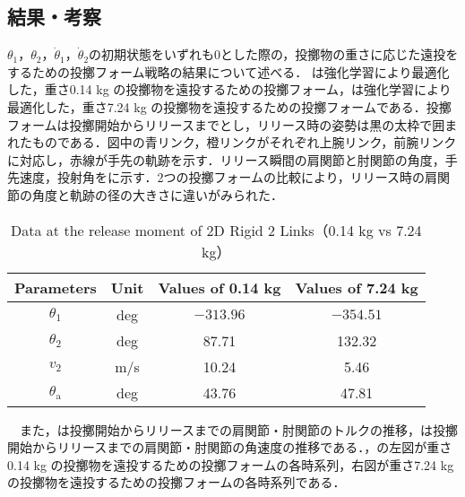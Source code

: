 \subsection{結果・考察}
$\theta_{1}$，$\theta_{2}$，$\dot{\theta}_{1}$，$\dot{\theta}_{2}$の初期状態をいずれも0とした際の，投擲物の重さに応じた遠投をするための投擲フォーム戦略の結果について述べる．
は強化学習により最適化した，重さ0.14 kg の投擲物を遠投するための投擲フォーム，は強化学習により最適化した，重さ7.24 kg の投擲物を遠投するための投擲フォームである．投擲フォームは投擲開始からリリースまでとし，リリース時の姿勢は黒の太枠で囲まれたものである．図中の青リンク，橙リンクがそれぞれ上腕リンク，前腕リンクに対応し，赤線が手先の軌跡を示す．リリース瞬間の肩関節と肘関節の角度，手先速度，投射角をに示す．2つの投擲フォームの比較により，リリース時の肩関節の角度と軌跡の径の大きさに違いがみられた．\\
\begin{table}[tb]
  \begin{center}
    \caption{Data at the release moment of 2D Rigid 2 Links（0.14 kg vs 7.24 kg）}
    \begin{tabular}{c|c|c|c}
      \hline
      Parameters & Unit & Values of 0.14 kg & Values of 7.24 kg \\
      \hline
      $\theta_{1}$ & deg & $-313.96$ & $-354.51$ \\
      $\theta_{2}$ & deg & 87.71 & 132.32 \\
      $v_{2}$ & m/s & 10.24 & 5.46 \\
      $\theta_{\mathrm{a}}$ & deg & 43.76 & 47.81 \\
      \hline
    \end{tabular}
  \end{center}
\end{table}
　また，は投擲開始からリリースまでの肩関節・肘関節のトルクの推移，は投擲開始からリリースまでの肩関節・肘関節の角速度の推移である．，の左図が重さ0.14 kg の投擲物を遠投するための投擲フォームの各時系列，右図が重さ7.24 kg の投擲物を遠投するための投擲フォームの各時系列である．\\
